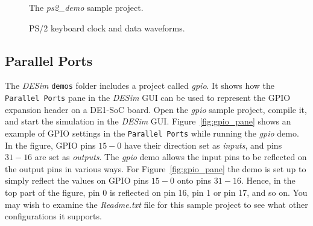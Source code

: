{\begin{figure}[t]
\begin{center}
        \fi
	\end{center}
          \caption{The {\it ps2\_demo} sample project.}
	\label{fig:ps2}
\end{figure}

\begin{figure}[h]
	\begin{center}
        \setlength{\fboxsep}{0pt}
	\end{center}
          \caption{PS/2 keyboard clock and data waveforms.}
	\label{fig:ps2_clk_dat}
\end{figure}

\subsection{Parallel Ports}

The {\it DESim} \texttt{demos} folder includes a project called {\it gpio}. It shows how 
the \texttt{Parallel Ports} pane in the {\it DESim} GUI can be used to represent the GPIO
expansion header on a DE1-SoC board. Open the {\it gpio} sample project, compile it, and
start the simulation in the {\it DESim} GUI. Figure~\ref{fig:gpio_pane} shows an example
of GPIO settings in the \texttt{Parallel Ports} while running the {\it gpio} demo. In the
figure, GPIO pins $15 - 0$ have their direction set as {\it inputs}, and pins $31 - 16$
are set as {\it outputs}. The {\it gpio} demo allows the input pins to be reflected on the
output pins in various ways. For Figure~\ref{fig:gpio_pane} the demo is set up to simply
reflect the values on GPIO pins $15 - 0$ onto pins $31 - 16$. Hence, in the top part of
the figure, pin 0 is reflected on pin 16, pin 1 or pin 17, and so on. You may wish to
examine the {\it Readme.txt} file for this sample project to see what other configurations
it supports.

}

